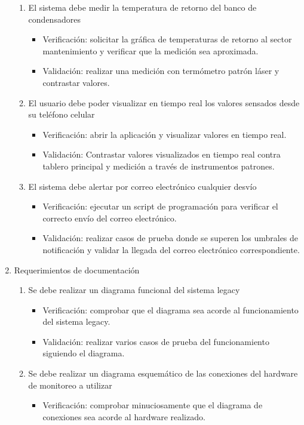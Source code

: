 \documentclass[
11pt, %
]{charter}
\begin{document}
\begin{enumerate}
\begin{enumerate}
			\item El sistema debe medir la temperatura de retorno del banco de condensadores
			\begin{itemize}
				\item Verificación: solicitar la gráfica de temperaturas de retorno al sector mantenimiento y verificar que la medición sea aproximada.
				\item Validación: realizar una medición con termómetro patrón láser y contrastar valores.
			\end{itemize}
			\item El usuario debe poder visualizar en tiempo real los valores sensados desde su teléfono celular
			\begin{itemize}
				\item Verificación: abrir la aplicación y visualizar valores en tiempo real.
				\item Validación: Contrastar valores visualizados en tiempo real contra tablero principal y medición a través de instrumentos patrones.
			\end{itemize}
			\item El sistema debe alertar por correo electrónico cualquier desvío
			\begin{itemize}
				\item Verificación: ejecutar un script de programación para verificar el correcto envío del correo electrónico.
				\item Validación: realizar casos de prueba donde se superen los umbrales de notificación y validar la llegada del correo electrónico correspondiente.
			\end{itemize}
		\end{enumerate}
	\item Requerimientos de documentación
		\begin{enumerate}		
			\item Se debe realizar un diagrama funcional del sistema legacy
			\begin{itemize}
				\item Verificación: comprobar que el diagrama sea acorde al funcionamiento del sistema legacy.
				\item Validación: realizar varios casos de prueba del funcionamiento siguiendo el diagrama.
			\end{itemize}
			\item Se debe realizar un diagrama esquemático de las conexiones del hardware de monitoreo a utilizar
			\begin{itemize}
				\item Verificación: comprobar minuciosamente que el diagrama de conexiones sea acorde al hardware realizado.

\end{itemize}
\end{enumerate}
\end{enumerate}
\end{document}
